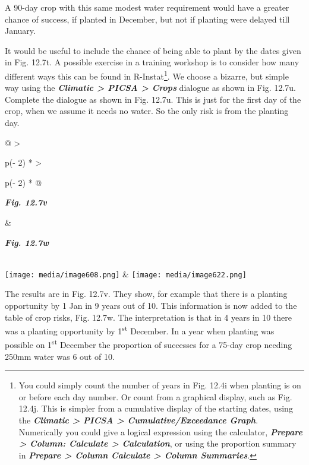 \documentclass[
  letterpaper,
  DIV=11,
  numbers=noendperiod]{scrreprt}
\begin{document}
A 90-day crop with this same modest water requirement would have a
greater chance of success, if planted in December, but not if planting
were delayed till January.

It would be useful to include the chance of being able to plant by the
dates given in Fig. 12.7t. A possible exercise in a training workshop is
to consider how many different ways this can be found in
R-Instat\footnote{You could simply count the number of years in Fig.
  12.4i when planting is on or before each day number. Or count from a
  graphical display, such as Fig. 12.4j. This is simpler from a
  cumulative display of the starting dates, using the
  \textbf{\emph{Climatic \textgreater{} PICSA \textgreater{}
  Cumulative/Exceedance Graph}}. Numerically you could give a logical
  expression using the calculator, \textbf{\emph{Prepare \textgreater{}
  Column: Calculate \textgreater{} Calculation}}, or using the
  proportion summary in \textbf{\emph{Prepare \textgreater{} Column
  Calculate \textgreater{} Column Summaries}}.}. We choose a bizarre,
but simple way using the \textbf{\emph{Climatic \textgreater{} PICSA
\textgreater{} Crops}} dialogue as shown in Fig. 12.7u. Complete the
dialogue as shown in Fig. 12.7u. This is just for the first day of the
crop, when we assume it needs no water. So the only risk is from the
planting day.

\begin{longtable}[]{@{}
  >{\raggedright\arraybackslash}p{(\columnwidth - 2\tabcolsep) * }
  >{\raggedright\arraybackslash}p{(\columnwidth - 2\tabcolsep) * }@{}}
\toprule\noalign{}
\begin{minipage}[b]{\linewidth}\raggedright
\textbf{\emph{Fig. 12.7v}}
\end{minipage} & \begin{minipage}[b]{\linewidth}\raggedright
\textbf{\emph{Fig. 12.7w}}
\end{minipage} \\
\midrule\noalign{}
\endhead
\bottomrule\noalign{}
\endlastfoot
\texttt{[image: media/image608.png]} &
\texttt{[image: media/image622.png]} \\
\end{longtable}

The results are in Fig. 12.7v. They show, for example that there is a
planting opportunity by 1 Jan in 9 years out of 10. This information is
now added to the table of crop risks, Fig. 12.7w. The interpretation is
that in 4 years in 10 there was a planting opportunity by
1\textsuperscript{st} December. In a year when planting was possible on
1\textsuperscript{st} December the proportion of successes for a 75-day
crop needing 250mm water was 6 out of 10.
\end{document}
